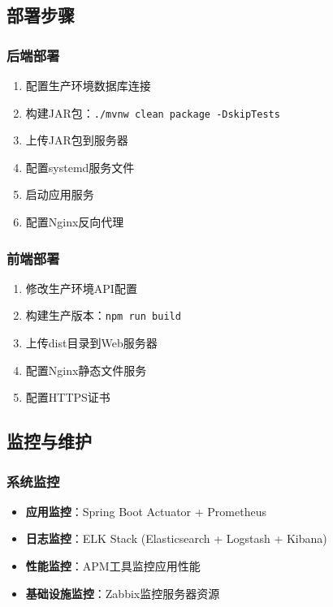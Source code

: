 \documentclass[12pt,a4paper]{article}
\begin{document}
\subsection{部署步骤}

\subsubsection{后端部署}
\begin{enumerate}
    \item 配置生产环境数据库连接
    \item 构建JAR包：\texttt{./mvnw clean package -DskipTests}
    \item 上传JAR包到服务器
    \item 配置systemd服务文件
    \item 启动应用服务
    \item 配置Nginx反向代理
\end{enumerate}

\subsubsection{前端部署}
\begin{enumerate}
    \item 修改生产环境API配置
    \item 构建生产版本：\texttt{npm run build}
    \item 上传dist目录到Web服务器
    \item 配置Nginx静态文件服务
    \item 配置HTTPS证书
\end{enumerate}

\subsection{监控与维护}

\subsubsection{系统监控}
\begin{itemize}
    \item \textbf{应用监控}：Spring Boot Actuator + Prometheus
    \item \textbf{日志监控}：ELK Stack (Elasticsearch + Logstash + Kibana)
    \item \textbf{性能监控}：APM工具监控应用性能
    \item \textbf{基础设施监控}：Zabbix监控服务器资源
\end{itemize}
\end{document}

